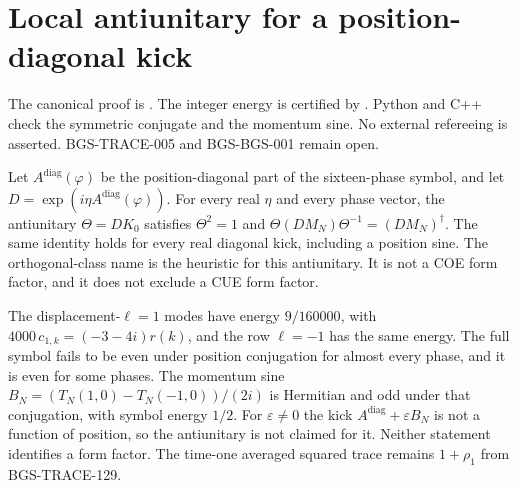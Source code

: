 \section{Local antiunitary for a position-diagonal kick}
\label{sec:sixteen-phase-symmetry}
The canonical proof is
.
The integer energy is certified by
.
Python and C++ check the symmetric conjugate and the momentum sine.
No external refereeing is asserted.
BGS-TRACE-005 and BGS-BGS-001 remain open.


\begin{theorem}
\label{thm:sixteen-phase-symmetry}
Let \(A^{\mathrm{diag}}(\varphi)\) be the position-diagonal part of the sixteen-phase
symbol, and let \(D=\exp(i\eta A^{\mathrm{diag}}(\varphi))\). For every real \(\eta\)
and every phase vector, the antiunitary \(\Theta=DK_0\) satisfies \(\Theta^2=1\) and
\(\Theta(DM_N)\Theta^{-1}=(DM_N)^\dagger\). The same identity holds for every real
diagonal kick, including a position sine. The orthogonal-class name is the
heuristic for this antiunitary. It is not a COE form factor, and it does not
exclude a CUE form factor.

The displacement-\(\ell=1\) modes have energy \(9/160000\), with
\(4000\,c_{1,k}=(-3-4i)r(k)\), and the row \(\ell=-1\) has the same energy.
The full symbol fails to be even under position conjugation for almost every
phase, and it is even for some phases. The momentum sine
\(B_N=(T_N(1,0)-T_N(-1,0))/(2i)\) is Hermitian and odd under that conjugation,
with symbol energy \(1/2\). For \(\varepsilon\ne 0\) the kick
\(A^{\mathrm{diag}}+\varepsilon B_N\) is not a function of position, so the
antiunitary is not claimed for it. Neither statement identifies a form factor.
The time-one averaged squared trace remains \(1+\rho_1\) from BGS-TRACE-129.
\end{theorem}
